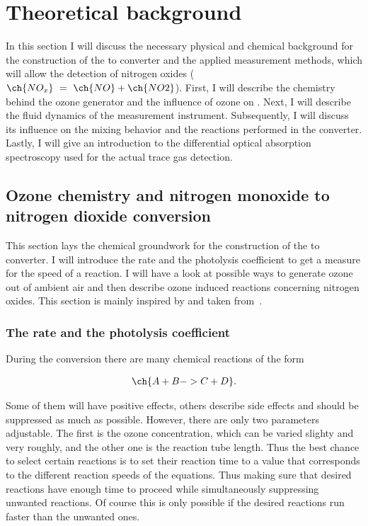 \section{Theoretical background}
\label{sec:theory}

In this section I will discuss the necessary physical and chemical
background for the construction of the  to  converter
and the applied measurement methods, which will allow the detection of
nitrogen oxides ($\ch{NO_x}\ =\ \ch{NO} + \ch{NO2}$). First, I will
describe the chemistry behind the ozone generator and the influence of
ozone on . Next, I will describe the fluid dynamics of the
measurement instrument. Subsequently, I will discuss its influence on the
mixing behavior and the reactions performed in the converter. Lastly,
I will give an introduction to the differential optical absorption
spectroscopy used for the actual trace gas detection.

\subsection{Ozone chemistry and nitrogen monoxide to nitrogen dioxide conversion}
\label{sec:chemistry}

This section lays the chemical groundwork for the construction of the
 to  converter. I will introduce the rate and the
photolysis coefficient to get a measure for the speed of a
reaction. I will have a look at possible ways to generate
ozone out of ambient air and then describe ozone induced reactions
concerning nitrogen oxides. This section is mainly inspired by and
taken from~\cite{bsc}.

\subsubsection{The rate and the photolysis coefficient}
\label{sec:rate}

During the conversion there are many chemical reactions of the form

\begin{align}
  \ch{A + B -> C + D}. \label{eq:prototype}
\end{align}

Some of them will have positive effects, others describe side effects
and should be suppressed as much as possible. However, there are only
two parameters adjustable. The first is the ozone concentration, which
can be varied slighty and very roughly, and the other one is the
reaction tube length. Thus the best chance to select certain reactions
is to set their reaction time to a value that corresponds to the
different reaction speeds of the equations. Thus making sure that
desired reactions have enough time to proceed while simultaneously
suppressing unwanted reactions. Of course this is only possible if
the desired reactions run faster than the unwanted ones.

